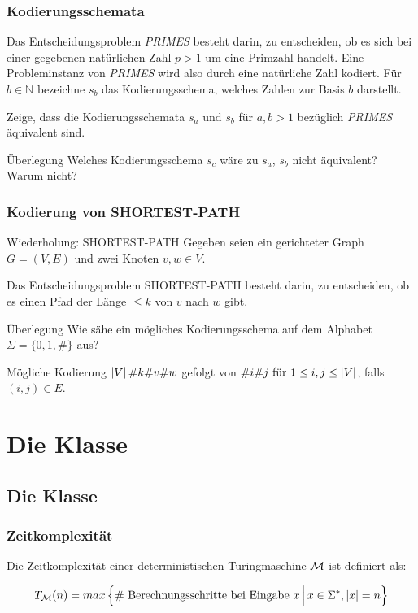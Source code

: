 \begin{frame}
 \frametitle{Kodierungsschemata}
 Das Entscheidungsproblem \textit{PRIMES} besteht darin, zu entscheiden, ob es sich bei einer gegebenen natürlichen Zahl $p>1$ um eine Primzahl handelt. 
Eine Probleminstanz von \textit{PRIMES} wird also durch eine natürliche Zahl kodiert. 
Für $b\in \mathbb{N}$ bezeichne $s_b$ das Kodierungsschema, welches Zahlen zur Basis $b$ darstellt.

Zeige, dass die Kodierungsschemata $s_a$ und $s_b$ für $a,b>1$ bezüglich \textit{PRIMES} äquivalent sind.

\begin{block}{Überlegung}
 Welches Kodierungsschema $s_c$ wäre zu $s_a$, $s_b$ nicht äquivalent? Warum nicht?
\end{block}
\end{frame}

\begin{frame}
\frametitle{Kodierung von SHORTEST-PATH}
 \begin{block}{Wiederholung: SHORTEST-PATH}
  Gegeben seien ein gerichteter Graph $G = (V, E)$ und zwei Knoten $v, w \in V$.
  
  Das Entscheidungsproblem SHORTEST-PATH besteht darin, zu entscheiden, ob es einen Pfad der Länge $\leq k$ von $v$ nach $w$ gibt.
 \end{block}
 \begin{block}{Überlegung}
 Wie sähe ein mögliches Kodierungsschema auf dem Alphabet $\Sigma = \{0,1,\#\}$ aus?
 \end{block}
 \invincible \pause
 \begin{block}{Mögliche Kodierung}
 $\left\vert V \right\vert\#k\#v\#w$ gefolgt von $\#i\#j \text{ für } 1 \leq i,j \leq \left\vert V \right\vert$, falls $(i, j) \in E$.
 \end{block}
 
 \vincible
\end{frame}

\section{Die Klasse \classP}
\subsection{Die Klasse \classP}
\begin{frame}
	\frametitle{Zeitkomplexität}
	
	Die Zeitkomplexität einer deterministischen Turingmaschine $\mathcal{M}$ ist definiert als:
	
	$$T_{\mathcal{M}}(n) = max \left\lbrace \vphantom{x^j_j} \text{\# Berechnungsschritte bei Eingabe $x$} \,\middle\vert\, x \in \Sigma^*, \left\vert x \right\vert = n \right\rbrace$$
\end{frame}

